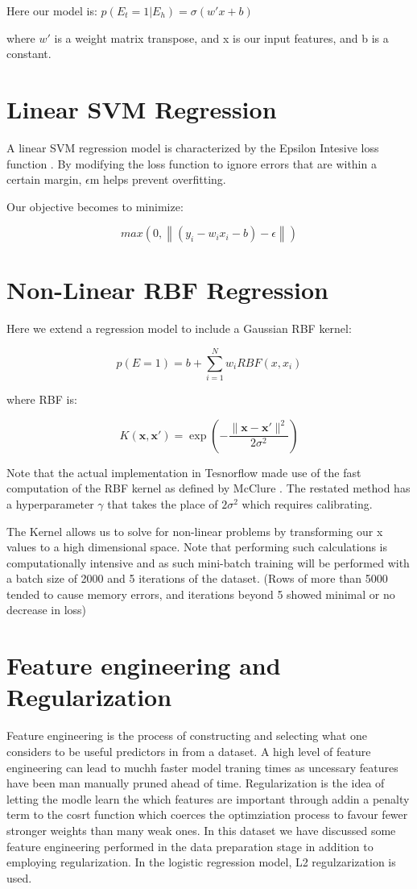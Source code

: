 Here our model is:
$p(E_t = 1 | E_h) =  \sigma(w'x + b)$

where $w'$ is a weight matrix transpose, and x is our input features, and b is a constant. 

\section{Linear SVM Regression}

A linear SVM regression model is characterized by the Epsilon Intesive loss function \parencite{Vapnik}. By modifying the loss function to ignore errors that are within a certain margin, $\epsilon$m helps prevent overfitting.

Our objective becomes to minimize:

$$max(0,\left\| (y_i - w_i x_i - b) - \epsilon \right\|)$$


\section{Non-Linear RBF Regression}

Here we extend a regression model to include a Gaussian RBF kernel:

$$p(E=1)=b+\sum^N_{i=1}w_iRBF(x,x_i)$$

where RBF is:

$$K(\mathbf {x} ,\mathbf {x'} )=\exp \left(-{\frac {\|\mathbf {x} -\mathbf {x'} \|^{2}}{2\sigma ^{2}}}\right)$$

Note that the actual implementation in Tesnorflow made use of the fast computation of the RBF kernel as defined by McClure \parencite{TFCookbook}. The restated method has a hyperparameter $\gamma$ that takes the place of $2\sigma^2$ which requires calibrating.

The Kernel allows us to solve for non-linear problems by transforming our x values to a high dimensional space. Note that performing such calculations is computationally intensive and as such mini-batch training will be performed with a batch size of 2000 and 5 iterations of the dataset. (Rows of more than 5000 tended to cause memory errors, and iterations beyond 5 showed minimal or no decrease in loss)

\section{Feature engineering and Regularization}

Feature engineering is the process of constructing and selecting what one considers to be useful predictors in from a dataset. A high level of feature engineering can lead to muchh faster model traning times as uncessary features have been man manually pruned ahead of time. Regularization is the idea of letting the modle learn the which features are important through addin a penalty term to the cosrt function which coerces the optimziation process to favour fewer stronger weights than many weak ones. In this dataset we have discussed some feature engineering performed in the data preparation stage in addition to employing regularization. In the logistic regression model, L2 regulzarization is used.


